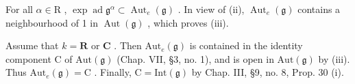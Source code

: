 For all \(\alpha \in \mathrm{R}\) , \(\exp \operatorname{ad} \mathfrak{g}^{\alpha} \subset \operatorname{Aut}_{e}(\mathfrak{g})\) . In view of (ii), \(\operatorname{Aut}_{e}(\mathfrak{g})\) contains a neighbourhood of 1 in \(\operatorname{Aut}(\mathfrak{g})\) , which proves (iii).

Assume that \(k = \mathbf{R}\) or \(\mathbf{C}\) . Then \(\mathrm{Aut}_e(\mathfrak{g})\) is contained in the identity component \(\mathrm{C}\) of \(\mathrm{Aut}(\mathfrak{g})\) (Chap. VII, §3, no. 1), and is open in \(\mathrm{Aut}(\mathfrak{g})\) by (iii). Thus \(\mathrm{Aut}_e(\mathfrak{g}) = \mathrm{C}\) . Finally, \(\mathrm{C} = \mathrm{Int}(\mathfrak{g})\) by Chap. III, §9, no. 8, Prop. 30 (i).

